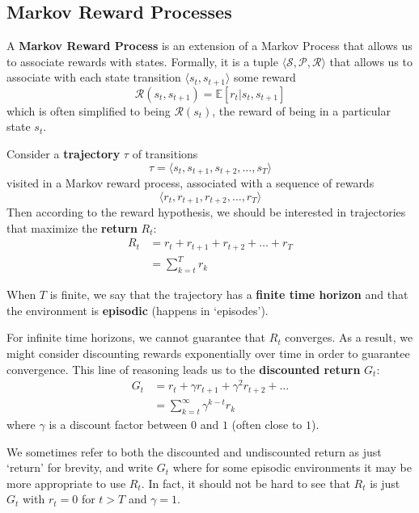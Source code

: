 \documentclass[journal, onecolumn, 12pt, draftclsnofoot]{IEEEtran}
\newcommand{\kword}[1]{\textbf{#1}}
\newcommand{\mc}[1]{\mathcal{#1}}
\begin{document}
	\subsection{Markov Reward Processes}
	\par A \kword{Markov Reward Process} is an extension of a Markov Process that allows us to associate rewards with states. Formally, it is a tuple $\langle \mc{S}, \mc{P}, \mc{R} \rangle$ that allows us to associate with each state transition $\langle s_t, s_{t+1} \rangle$ some reward
	\begin{equation}
		\label{eqn:reward_process}
		\mc{R}(s_t, s_{t+1}) = \mathbb{E}\left[r_t \big\vert s_t, s_{t+1} \right]
	\end{equation}
	which is often simplified to being $\mc{R}(s_t)$, the reward of being in a particular state $s_t$.
	\par Consider a \kword{trajectory} $\tau$ of transitions
	$$\tau = \langle s_t, s_{t+1}, s_{t+2}, \dots, s_{T} \rangle $$
	visited in a Markov reward process, associated with a sequence of rewards
		$$
		\langle r_t, r_{t+1}, r_{t+2}, \dots, r_{T} \rangle
		$$
	Then according to the reward hypothesis, we should be interested in trajectories that maximize the \kword{return} $R_t$:
	\begin{align}
		\label{eqn:undiscounted_rewards}
		R_t &= r_t + r_{t+1} +  r_{t+2}+  \dots + r_T  \\
		&= \sum_{k=t}^T r_k \nonumber
	\end{align}
	\par When $T$ is finite, we say that the trajectory has a \kword{finite time horizon} and that the environment is \kword{episodic} (happens in `episodes').
	\par For infinite time horizons, we cannot guarantee that $R_t$ converges. As a result, we might consider discounting rewards exponentially over time in order to guarantee convergence. This line of reasoning leads us to the \kword{discounted return} $G_t$:
	\begin{align}
		\label{eqn:G}
		G_t &= r_{t} + \gamma r_{t+1} + \gamma^2 r_{t+2} + \dots \\
		&= \sum_{k=t}^\infty \gamma^{k-t} r_k \nonumber
	\end{align}
	where $\gamma$ is a discount factor between $0$ and $1$ (often close to $1$).
	\par We sometimes refer to both the discounted and undiscounted return as just `return' for brevity, and write $G_t$ where for some episodic environments it may be more appropriate to use $R_t$. In fact, it should not be hard to see that $R_t$ is just $G_t$ with $r_t = 0$ for $t > T$ and $\gamma = 1$.
\end{document}
